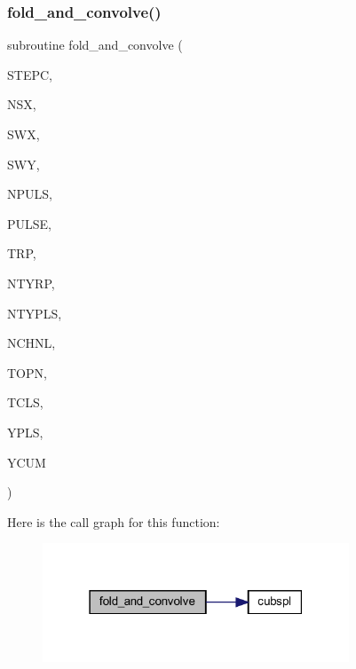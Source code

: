 \mbox{\label{Leroi__c_8f90_adf5b72e5e0c8b51d6d076cc274531811}} 
\subsubsection{\texorpdfstring{fold\+\_\+and\+\_\+convolve()}{fold\_and\_convolve()}}
{\footnotesize\ttfamily subroutine fold\+\_\+and\+\_\+convolve (\begin{DoxyParamCaption}\item[{integer}]{S\+T\+E\+PC,  }\item[{integer}]{N\+SX,  }\item[{real, dimension(nsx)}]{S\+WX,  }\item[{real, dimension(nsx,3)}]{S\+WY,  }\item[{integer}]{N\+P\+U\+LS,  }\item[{real}]{P\+U\+L\+SE,  }\item[{real, dimension(ntyrp)}]{T\+RP,  }\item[{integer}]{N\+T\+Y\+RP,  }\item[{integer}]{N\+T\+Y\+P\+LS,  }\item[{integer}]{N\+C\+H\+NL,  }\item[{real, dimension(nchnl)}]{T\+O\+PN,  }\item[{real, dimension(nchnl)}]{T\+C\+LS,  }\item[{real, dimension(4,ntyrp)}]{Y\+P\+LS,  }\item[{real, dimension(nchnl)}]{Y\+C\+UM }\end{DoxyParamCaption})}

Here is the call graph for this function\+:\nopagebreak
\begin{figure}[H]
\begin{center}
\leavevmode
\includegraphics[width=259pt]{Leroi__c_8f90_adf5b72e5e0c8b51d6d076cc274531811_cgraph}
\end{center}
\end{figure}
\mbox{\label{Leroi__c_8f90_a2ce05aab7ca8a8111b718d33c0f7029c}} 
